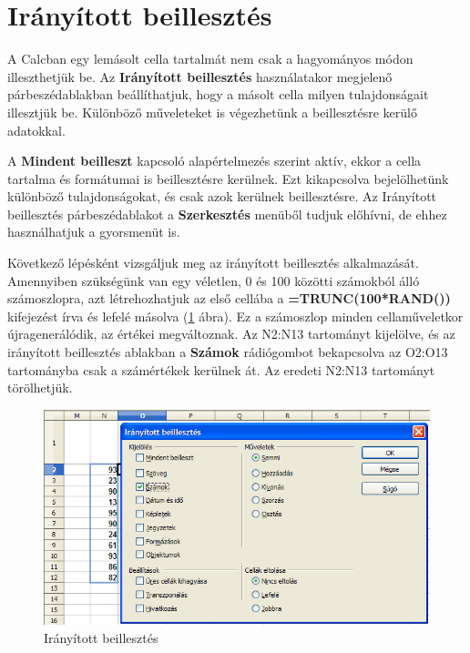 \section{Irányított beillesztés}

A Calcban egy lemásolt cella tartalmát nem csak a hagyományos
módon illeszthetjük be. Az \textbf{Irányított beillesztés}
használatakor megjelenő párbeszédablakban beállíthatjuk,
hogy a másolt cella milyen tulajdonságait illesztjük be.
Különböző műveleteket is végezhetünk a
beillesztésre kerülő adatokkal.

A \textbf{Mindent beilleszt} kapcsoló alapértelmezés szerint
aktív, ekkor a cella tartalma és formátumai is beillesztésre
kerülnek. Ezt kikapcsolva bejelölhetünk különböző
tulajdonságokat, és csak azok kerülnek beillesztésre. Az
Irányított beillesztés párbeszédablakot a
\textbf{Szerkesztés} menüből tudjuk előhívni, de ehhez
használhatjuk a gyorsmenüt is.

Következő lépésként vizsgáljuk meg az irányított beillesztés alkalmazását.
Amennyiben szükségünk van egy véletlen, 0 és 100 közötti
számokból álló számoszlopra, azt létrehozhatjuk az első
cellába a \textbf{=TRUNC(100*RAND())} kifejezést
írva és lefelé másolva (\ref{IrányítottBeillesztés} ábra).
Ez a számoszlop minden
cellaműveletkor újragenerálódik, az értékei
megváltoznak. Az N2:N13 tartományt kijelölve, és az
irányított beillesztés ablakban a \textbf{Számok}
rádiógombot bekapcsolva az O2:O13 tartományba csak a
számértékek kerülnek át. Az eredeti N2:N13 tartományt
törölhetjük.

\begin{figure}[!h]
\begin{center}
\includegraphics[width=15.999cm]{oocalcv1-img160.png}
\caption{Irányított beillesztés}\label{IrányítottBeillesztés}
\end{center}
\end{figure}



